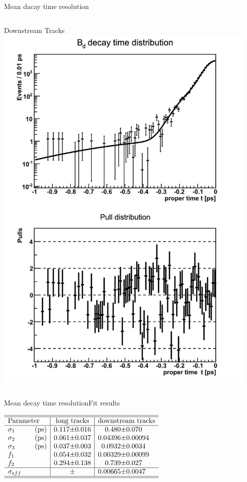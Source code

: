 \documentclass{beamer}
\begin{document}
\begin{frame}{Mean dacay time resolution}
\begin{columns}
\begin{block}{Downstream Tracks}
	\includegraphics[width=0.95\textwidth]{resolution_ds}
	\end{block}
	\end{columns}
	\end{frame}

    \begin{frame}{Mean decay time resolution}{Fit results}
    \begin{center}
    $\begin{array}{l | r@{\pm}l | r@{\pm}l}
\hline 
\hline
\text{Parameter} & \multicolumn{2}{c|}{\text{long tracks}} & \multicolumn{2}{c}{\text{downstream tracks}}\\
\hline
\sigma_{1}\hspace{1cm}(\text{ps}) &	0.117 & 0.016 & 0.480 & 0.070\\
\sigma_{2}\hspace{1cm}(\text{ps}) &	0.061 & 0.037 & 0.04396 & 0.00094\\
\sigma_{3}\hspace{1cm}(\text{ps}) &0.037 &	0.003 & 0.0932 & 0.0034 \\
f_{1} & 0.054 & 0.032 & 0.00329 & 0.00099\\
f_{2} & 0.294 & 0.138 & 0.739 & 0.027\\ \hline 
\sigma_{eff} & & & 0.00665 & 0.0047 \\ \hline \hline
\end{array}$   
    \end{center}
    \end{frame}        	
	
\end{document}
